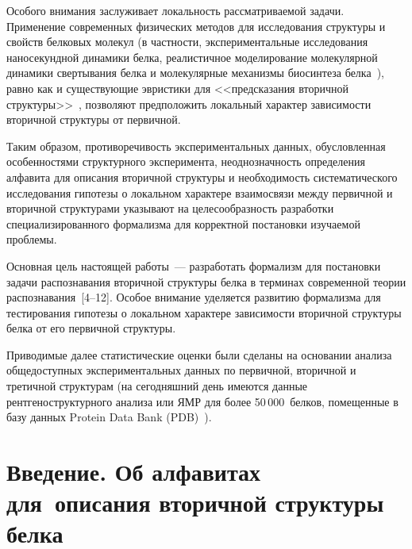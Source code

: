 \begin{multicols}{2}
     Особого внимания заслуживает локальность рассматриваемой задачи. 
Применение современных физических методов для исследования структуры и 
свойств белковых молекул (в частности, экспериментальные исследования 
наносекундной динамики белка, реалистичное моделирование молекулярной 
динамики свертывания белка и молекулярные механизмы биосинтеза 
     белка~\cite{1tor, 13tor, 14tor}), равно как  и существующие эвристики для 
<<предсказания вторичной структуры>>~\cite{3tor}, позволяют предположить 
локальный характер зависимости вторичной структуры от пер\-вичной.
     
     Таким образом, противоречивость экспериментальных данных, 
обусловленная особенностями структурного эксперимента, неоднозначность 
определения алфавита для описания вторичной структуры и необходимость 
систематического исследования гипотезы о локальном характере взаимосвязи 
между первичной и вторичной структурами указывают на целесообразность 
разработки специализированного формализма для корректной постановки 
изучаемой проб\-лемы. 
     
     Основная цель настоящей работы~--- разработать формализм для 
постановки задачи распознавания вторичной структуры белка в терминах 
современной теории распознавания~[4--12]. Особое внимание 
уделяется развитию формализма для тестирования гипотезы о локальном 
характере зависимости вторичной структуры белка от его первичной 
струк\-туры.
     
     Приводимые далее статистические оценки были сделаны на основании 
анализа общедоступных экспериментальных данных по первичной, вторичной 
и третичной структурам (на сегодняшний день имеются данные  
рентгеноструктурного анализа или ЯМР для более 50\,000~белков, помещенные 
в базу данных Protein Data Bank (PDB)~\cite{2tor}). 

\section{Введение. Об алфавитах для~описания вторичной 
структуры белка}


\end{multicols}

